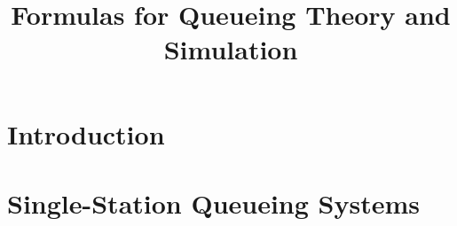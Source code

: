 \documentclass{book}
\title{Formulas for Queueing Theory and Simulation}
\begin{document}
\maketitle

\tableofcontents


\chapter{Introduction}\label{sec:introduction}

%
%
%

\chapter{Single-Station Queueing Systems}

%
 
%
%
%
%
%
%
%
%
% 
%
%
%
% 
%
%
%
%
%
%
%
%
%
%
%
%




\cleardoublepage
{}
{}
\printindex

% 
% 
\end{document}
